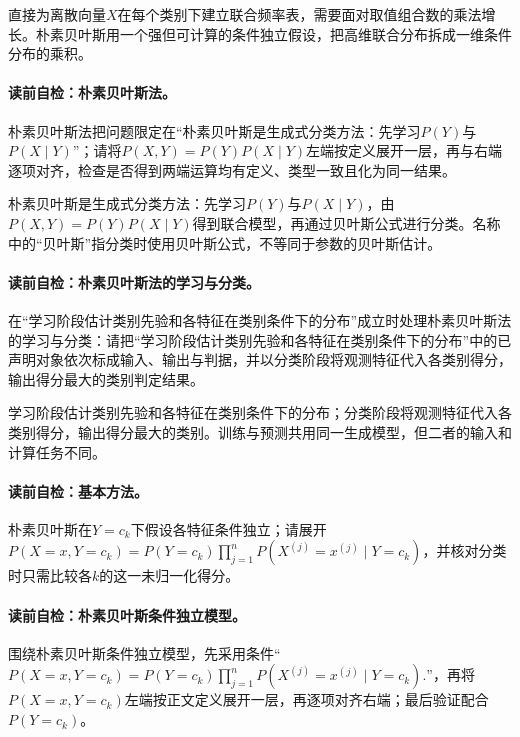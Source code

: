 \label{struct:V2-C03-CH06}
直接为离散向量$X$在每个类别下建立联合频率表，需要面对取值组合数的乘法增长。朴素贝叶斯用一个强但可计算的条件独立假设，把高维联合分布拆成一维条件分布的乘积。

\paragraph{读前自检：朴素贝叶斯法。}朴素贝叶斯法把问题限定在“朴素贝叶斯是生成式分类方法：先学习$P(Y)$与$P(X\mid Y)$”；请将$P(X,Y)=P(Y)P(X\mid Y)$左端按定义展开一层，再与右端逐项对齐，检查是否得到两端运算均有定义、类型一致且化为同一结果。\par

朴素贝叶斯是生成式分类方法：先学习$P(Y)$与$P(X\mid Y)$，由$P(X,Y)=P(Y)P(X\mid Y)$得到联合模型，再通过贝叶斯公式进行分类。名称中的“贝叶斯”指分类时使用贝叶斯公式，不等同于参数的贝叶斯估计。

\paragraph{读前自检：朴素贝叶斯法的学习与分类。}在“学习阶段估计类别先验和各特征在类别条件下的分布”成立时处理朴素贝叶斯法的学习与分类：请把“学习阶段估计类别先验和各特征在类别条件下的分布”中的已声明对象依次标成输入、输出与判据，并以分类阶段将观测特征代入各类别得分，输出得分最大的类别判定结果。\par

学习阶段估计类别先验和各特征在类别条件下的分布；分类阶段将观测特征代入各类别得分，输出得分最大的类别。训练与预测共用同一生成模型，但二者的输入和计算任务不同。

\paragraph{读前自检：基本方法。}朴素贝叶斯在$Y=c_k$下假设各特征条件独立；请展开$P(X=x,Y=c_k)=P(Y=c_k)\prod_{j=1}^{n}P(X^{(j)}=x^{(j)}\mid Y=c_k)$，并核对分类时只需比较各$k$的这一未归一化得分。\par

\label{struct:V2-C03-CH07}
\paragraph{读前自检：朴素贝叶斯条件独立模型。}围绕朴素贝叶斯条件独立模型，先采用条件“$P(X=x,Y=c_k)=P(Y=c_k)\prod_{j=1}^{n}P(X^{(j)}=x^{(j)}\mid Y=c_k).$”，再将$P(X=x,Y=c_k)$左端按正文定义展开一层，再逐项对齐右端；最后验证配合$P(Y=c_k)$。\par

